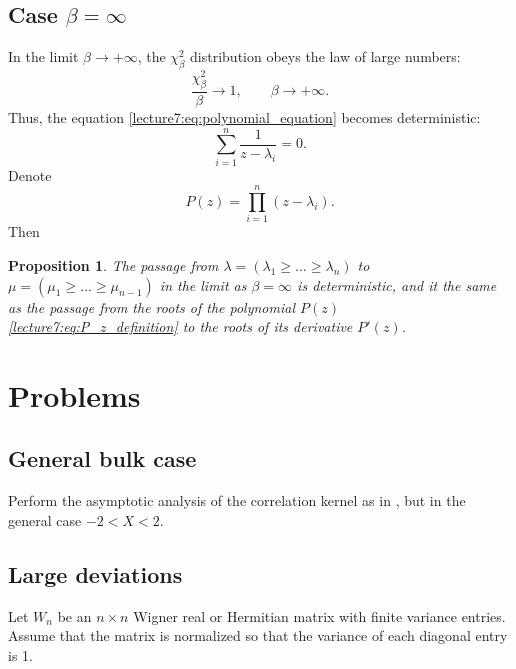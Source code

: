 \documentclass[letterpaper,11pt,oneside,reqno]{book}
\numberwithin{equation}{chapter}  %
\newtheorem{proposition}{Proposition}[chapter]  %
\theoremstyle{definition}
\begin{document}
\subsection{Case $\beta=\infty$}

In the limit $\beta\to+\infty$, the $\chi^2_\beta$ distribution
obeys the law of large numbers:
\begin{equation*}
	\frac{\chi^2_\beta}{\beta}\to 1,\qquad \beta\to+\infty.
\end{equation*}
Thus, the equation \eqref{lecture7:eq:polynomial_equation} becomes
deterministic:
\begin{equation*}
	\sum_{i=1}^n \frac{1}{z-\lambda_i}=0.
\end{equation*}
Denote 
\begin{equation}
	\label{lecture7:eq:P_z_definition}
	P(z)=\prod_{i=1}^n(z-\lambda_i).
\end{equation}
Then 
\begin{proposition}
	The passage from $\lambda=(\lambda_1\ge \ldots \ge \lambda_n )$
	to $\mu=(\mu_1\ge \ldots \ge \mu_{n-1} )$ in the limit as $\beta=\infty$
	is deterministic, and it the same as the passage from the 
	roots of the polynomial $P(z)$ \eqref{lecture7:eq:P_z_definition} to the roots of its derivative $P'(z)$.
\end{proposition}











\section{Problems}

\subsection{General bulk case}
\label{lecture7:prob:imaginary-critical-points}

Perform the asymptotic analysis of the correlation
kernel as in ,
but in the general case $-2<X<2$.


\subsection{Large deviations}
\label{lecture7:prob:large-deviation}

Let \(W_n\) be an \(n\times n\) Wigner real or Hermitian matrix with finite variance entries. Assume that the matrix is normalized so that the variance of each diagonal entry is 1.
\end{document}
